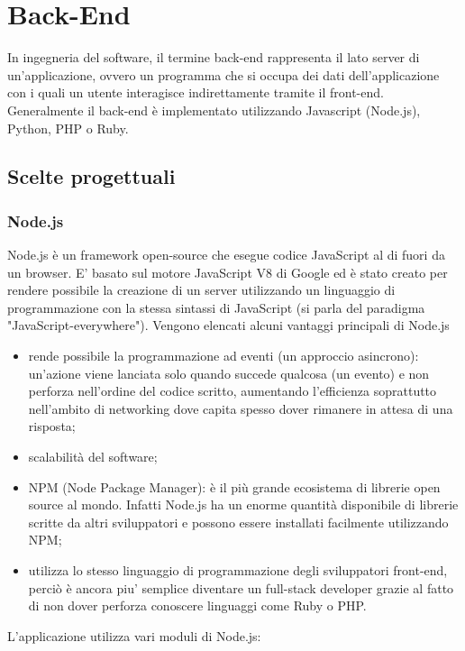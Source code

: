 \documentclass[12pt]{report}
\begin{document}
%
\section{Back-End}

In ingegneria del software, il termine back-end rappresenta il lato server di un'applicazione, ovvero un programma che si occupa dei dati dell'applicazione con i quali un utente interagisce indirettamente tramite il front-end. Generalmente il back-end è implementato utilizzando Javascript (Node.js), Python, PHP o Ruby.

\subsection{Scelte progettuali}

\subsubsection*{Node.js}

Node.js è un framework open-source che esegue codice JavaScript al di fuori da un browser. E' basato sul motore JavaScript V8 di Google ed è stato creato per rendere possibile la creazione di un server utilizzando un linguaggio di programmazione con la stessa sintassi di JavaScript (si parla del paradigma "JavaScript-everywhere"). Vengono elencati alcuni vantaggi principali di Node.js

\begin{itemize}
	\item rende possibile la programmazione ad eventi (un approccio asincrono): un'azione viene lanciata solo quando succede qualcosa (un evento) e non perforza nell'ordine del codice scritto, aumentando l'efficienza soprattutto nell'ambito di networking dove capita spesso dover rimanere in attesa di una risposta;
	\item scalabilità del software;
	\item NPM (Node Package Manager): è il più grande ecosistema di librerie open source al mondo. Infatti Node.js ha un enorme quantità disponibile di librerie scritte da altri sviluppatori e possono essere installati facilmente utilizzando NPM;
	\item utilizza lo stesso linguaggio di programmazione degli sviluppatori front-end, perciò è ancora piu' semplice diventare un full-stack developer grazie al fatto di non dover perforza conoscere linguaggi come Ruby o PHP.
\end{itemize}

L'applicazione utilizza vari moduli di Node.js:
\end{document}
